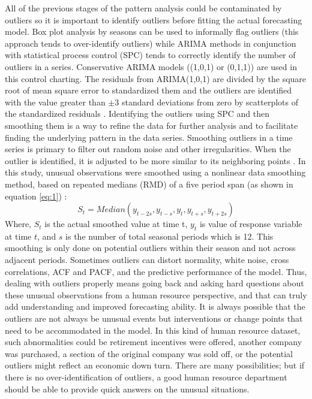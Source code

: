 All of the previous stages of the pattern analysis could be contaminated by outliers so it is important to identify outliers before fitting the actual forecasting model. Box plot analysis by seasons can be used to informally flag outliers (this approach tends to over-identify outliers) while ARIMA methods in conjunction with statistical process control (SPC) tends to correctly identify the number of outliers in a series. Conservative ARIMA models ((1,0,1) or (0,1,1))  are used in this control charting. The residuals from ARIMA(1,0,1) are divided by the square root of mean square error to standardized them and the outliers are identified with the value greater than $\pm3$ standard deviations from zero by scatterplots of the standardized residuals \citep{alwan1988, grznar1997}.
Identifying the outliers using SPC and then smoothing them is a way to refine the data for further analysis and to facilitate finding the underlying pattern in the data series. Smoothing outliers in a time series is primary to filter out random noise and other irregularities. When the outlier is identified, it is adjusted to be more similar to its neighboring points \citep{grznar1997}. In this study, unusual observations were smoothed using a nonlinear data smoothing method, based on repeated medians (RMD) of a five period span (as shown in equation \ref{eq:1}) \citep{velleman1980}:
\begin{equation} \label{eq:1}
	S_t=Median(y_{t-2s},y_{t-s},y_t,y_{t+s},y_{t+2s} ) 
\end{equation}
Where, $S_t$ is the actual smoothed value at time t, $y_t$ is value of response variable at time $t$, and $s$ is the number of total seasonal periods which is 12. This smoothing is only done on potential outliers within their season and not across adjacent periods. Sometimes outliers can distort normality, white noise, cross correlations, ACF and PACF, and the predictive performance of the model.  Thus, dealing with outliers properly means going back and asking hard questions about these unusual observations from a human resource perspective, and that can truly add understanding and improved forecasting ability.  It is always possible that the outliers are not always be unusual events but interventions or change points that need to be accommodated in the model.  In this kind of human resource dataset, such abnormalities could be retirement incentives were offered, another company was purchased, a section of the original company was sold off, or the potential outliers might reflect an economic down turn.  There are many possibilities; but if there is no over-identification of outliers, a good human resource department should be able to provide quick answers on the unusual situations.
